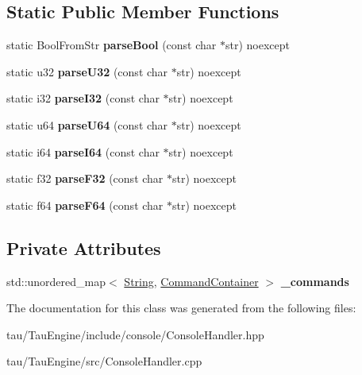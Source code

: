 \subsection*{Static Public Member Functions}
\begin{DoxyCompactItemize}
\item 
\mbox{\label{class_console_handler_aad02d1c973e1c1014f95369fe8462e76}} 
static Bool\+From\+Str {\bfseries parse\+Bool} (const char $\ast$str) noexcept
\item 
\mbox{\label{class_console_handler_aac67750a3f991a63390326047bff7b34}} 
static u32 {\bfseries parse\+U32} (const char $\ast$str) noexcept
\item 
\mbox{\label{class_console_handler_aaf407f96d01f284d8af3f641e39d64a3}} 
static i32 {\bfseries parse\+I32} (const char $\ast$str) noexcept
\item 
\mbox{\label{class_console_handler_a14931a5dfead62d70e55752c787bc92a}} 
static u64 {\bfseries parse\+U64} (const char $\ast$str) noexcept
\item 
\mbox{\label{class_console_handler_a60c21658d4635e3770c4332334c56d17}} 
static i64 {\bfseries parse\+I64} (const char $\ast$str) noexcept
\item 
\mbox{\label{class_console_handler_a68ca4d71215e1efb7b8be4ad9de80c61}} 
static f32 {\bfseries parse\+F32} (const char $\ast$str) noexcept
\item 
\mbox{\label{class_console_handler_a3d6d5f4e09c03caec9e84d48e376b621}} 
static f64 {\bfseries parse\+F64} (const char $\ast$str) noexcept
\end{DoxyCompactItemize}
\subsection*{Private Attributes}
\begin{DoxyCompactItemize}
\item 
\mbox{\label{class_console_handler_a1fb1dbe99338a6a7d5c6734909ab9f0a}} 
std\+::unordered\+\_\+map$<$ \mbox{\hyperlink{class_string}{String}}, \mbox{\hyperlink{struct_command_container}{Command\+Container}} $>$ {\bfseries \+\_\+commands}
\end{DoxyCompactItemize}


The documentation for this class was generated from the following files\+:\begin{DoxyCompactItemize}
\item 
tau/\+Tau\+Engine/include/console/Console\+Handler.\+hpp\item 
tau/\+Tau\+Engine/src/Console\+Handler.\+cpp\end{DoxyCompactItemize}
